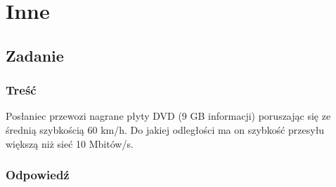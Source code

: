 			
			
		
			
\newpage
\section{Inne}
	\subsection{Zadanie}
		\subsubsection{Treść}
			Posłaniec przewozi nagrane płyty DVD (9 GB informacji) poruszając się ze średnią szybkością 60 km/h. Do jakiej odległości ma on szybkość przesyłu większą niż sieć 10 Mbitów/s.
		\subsubsection{Odpowiedź}
			
			
			